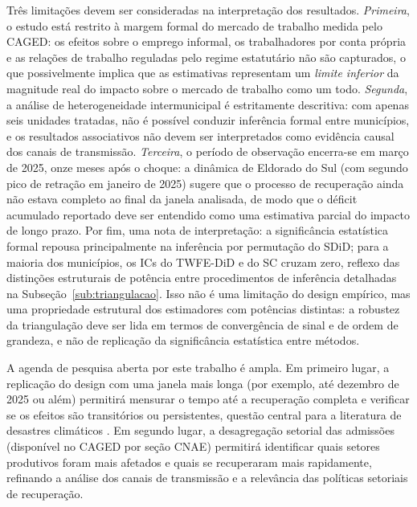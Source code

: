 \documentclass[a4paper,12pt]{article}
\begin{document}
Três limitações devem ser consideradas na interpretação dos resultados. \emph{Primeira},
o estudo está restrito à margem formal do mercado de trabalho medida pelo CAGED:
os efeitos sobre o emprego informal, os trabalhadores por conta própria e as relações de
trabalho reguladas pelo regime estatutário não são capturados, o que possivelmente
implica que as estimativas representam um \emph{limite inferior} da magnitude real do
impacto sobre o mercado de trabalho como um todo. \emph{Segunda}, a análise de
heterogeneidade intermunicipal é estritamente descritiva: com apenas seis unidades
tratadas, não é possível conduzir inferência formal entre municípios, e os resultados
associativos não devem ser interpretados como evidência causal dos canais de transmissão.
\emph{Terceira}, o período de observação encerra-se em março de 2025, onze meses após
o choque: a dinâmica de Eldorado do Sul (com segundo pico de retração em janeiro de
2025) sugere que o processo de recuperação ainda não estava completo ao final da janela
analisada, de modo que o déficit acumulado reportado deve ser entendido como uma
estimativa parcial do impacto de longo prazo. Por fim, uma nota de interpretação: a significância estatística formal repousa
principalmente na inferência por permutação do SDiD; para a maioria dos municípios,
os ICs do TWFE-DiD e do SC cruzam zero, reflexo das distinções estruturais de
potência entre procedimentos de inferência detalhadas na Subseção~\ref{sub:triangulacao}.
Isso não é uma limitação do design empírico, mas uma propriedade estrutural dos
estimadores com potências distintas: a robustez da triangulação deve ser lida em termos
de convergência de sinal e de ordem de grandeza, e não de replicação da significância
estatística entre métodos.

A agenda de pesquisa aberta por este trabalho é ampla. Em primeiro lugar, a replicação do
design com uma janela mais longa (por exemplo, até dezembro de 2025 ou além) permitirá
mensurar o tempo até a recuperação completa e verificar se os efeitos são transitórios ou
persistentes, questão central para a literatura de desastres climáticos
\cite{kahn2005death, berlemann2018}. Em segundo lugar, a desagregação setorial das
admissões (disponível no CAGED por seção CNAE) permitirá identificar quais setores
produtivos foram mais afetados e quais se recuperaram mais rapidamente, refinando a
análise dos canais de transmissão e a relevância das políticas setoriais de recuperação.
\end{document}
